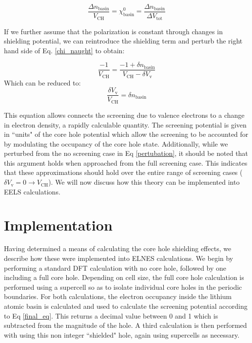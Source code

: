 \begin{equation}
\frac{\Delta n _{\mathrm{basin}}}{V_{\mathrm{CH}}} = \chi^0_{\mathrm{basin}} = \frac{\Delta n _{\mathrm{basin}}}{\Delta V_{\mathrm{tot}}}
\label{chi_naught}
\end{equation}

If we further assume that the polarization is constant through changes in shielding potential, we can reintroduce the shielding term and perturb the right hand side of Eq. \ref{chi_naught} to obtain: 


\begin{equation}
\frac{-1}{V_{\mathrm{CH}}} = \frac{-1+\delta n_{\mathrm{basin}}}{V_{\mathrm{CH}}-\delta V_{\mathrm{v}}}
\label{pertubation}
\end{equation}
Which can be reduced to:
\begin{equation}
\frac{\delta V_{\mathrm{v}}}{V_{\mathrm{CH}}} = \delta n_{\mathrm{basin}}
\label{final_eq}
\end{equation}

This equation allows connects the screening due to valence electrons to a change in electron density, a rapidly calculable quantity.  The screening potential is given in ``units" of the core hole potential which allow the screening to be accounted for by modulating the occupancy of the core hole state.  Additionally, while we perturbed from the no screening case in Eq \ref{pertubation}, it should be noted that this argument holds when approached from the full screening case.  This indicates that these approximations should hold over the entire range of screening cases ($\delta V_{\mathrm{v}} = 0 \to V_{\mathrm{CH}}$).  We will now discuss how this theory can be implemented into EELS calculations.  

\section{Implementation} \label{implementation}
Having determined a means of calculating the core hole shielding effects, we describe how these were implemented into ELNES calculations.  We begin by performing a standard DFT calculation with no core hole, followed by one including a full core hole. Depending on cell size, the full core hole calculation is performed using a supercell so as to isolate individual core holes in the periodic boundaries. For both calculations, the electron occupancy inside the lithium atomic basin is calculated and used to calculate the screening potential according to Eq \ref{final_eq}.  This returns a decimal value between 0 and 1 which is subtracted from the magnitude of the hole.  A third calculation is then performed with using this non integer ``shielded" hole, again using supercells as necessary.  

